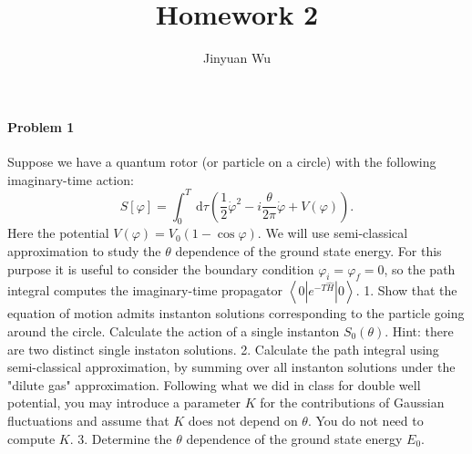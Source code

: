 \documentclass[hyperref, a4paper]{article}
\title{Homework 2}
\author{Jinyuan Wu}
\begin{document}
\maketitle

\paragraph{Problem 1} Suppose we have a quantum rotor (or particle on a circle) with the following imaginary-time action:
$$
S[\varphi]=\int_0^T \mathrm{~d} \tau\left(\frac{1}{2} \dot{\varphi}^2-i \frac{\theta}{2 \pi} \dot{\varphi}+V(\varphi)\right) .
$$
Here the potential $V(\varphi)=V_0(1-\cos \varphi)$. We will use semi-classical approximation to study the $\theta$ dependence of the ground state energy. For this purpose it is useful to consider the boundary condition $\varphi_i=\varphi_f=0$, so the path integral computes the imaginary-time propagator $\left\langle 0\left|e^{-T \hat{H}}\right| 0\right\rangle$.
1. Show that the equation of motion admits instanton solutions corresponding to the particle going around the circle. Calculate the action of a single instanton $S_0(\theta)$. Hint: there are two distinct single instaton solutions.
2. Calculate the path integral using semi-classical approximation, by summing over all instanton solutions under the "dilute gas" approximation. Following what we did in class for double well potential, you may introduce a parameter $K$ for the contributions of Gaussian fluctuations and assume that $K$ does not depend on $\theta$. You do not need to compute $K$.
3. Determine the $\theta$ dependence of the ground state energy $E_0$.
\end{document}

